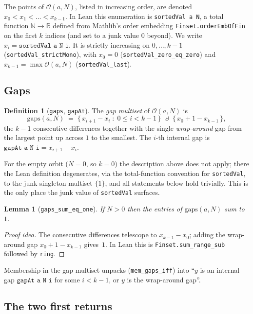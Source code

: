 \documentclass[11pt,reqno]{amsart}
\theoremstyle{plain}
\newtheorem{lemma}[theorem]{Lemma}
\theoremstyle{definition}
\newtheorem{definition}[theorem]{Definition}
\theoremstyle{remark}
\newcommand{\R}{\mathbb{R}}
\newcommand{\N}{\mathbb{N}}
\newcommand{\orb}{\mathcal{O}}
\newcommand{\code}[1]{\texttt{#1}}
\begin{document}
The points of $\orb(a,N)$, listed in increasing order, are denoted
$x_0 < x_1 < \dots < x_{k-1}$.  In Lean this enumeration is
\code{sortedVal a N}, a total function $\N\to\R$ defined from Mathlib's
order embedding \code{Finset.orderEmbOfFin} on the first $k$ indices (and set
to a junk value $0$ beyond).  We write
$x_i = \code{sortedVal a N i}$.  It is strictly increasing on $0,\dots,k-1$
(\code{sortedVal\_strictMono}), with $x_0 = 0$
(\code{sortedVal\_zero\_eq\_zero}) and $x_{k-1} = \max\orb(a,N)$
(\code{sortedVal\_last}).

\subsection{Gaps}

\begin{definition}[\code{gaps}, \code{gapAt}]
The \emph{gap multiset} of $\orb(a,N)$ is
\[
  \mathrm{gaps}(a,N) \;=\;
  \bigl\{\, x_{i+1}-x_i \;:\; 0 \le i < k-1 \,\bigr\}
  \;\uplus\;
  \bigl\{\, x_0 + 1 - x_{k-1} \,\bigr\},
\]
the $k-1$ consecutive differences together with the single \emph{wrap-around}
gap from the largest point up across $1$ to the smallest.  The $i$-th internal
gap is $\code{gapAt a N i} = x_{i+1}-x_i$.
\end{definition}

For the empty orbit ($N=0$, so $k=0$) the description above does not apply;
there the Lean definition degenerates, via the total-function convention for
\code{sortedVal}, to the junk singleton multiset $\{1\}$, and all statements
below hold trivially.  This is the only place the junk value of
\code{sortedVal} surfaces.

\begin{lemma}[\code{gaps\_sum\_eq\_one}]\label{lem:sum-one}
If $N>0$ then the entries of $\mathrm{gaps}(a,N)$ sum to~$1$.
\end{lemma}

\begin{proof}[Proof idea]
The consecutive differences telescope to $x_{k-1}-x_0$; adding the wrap-around
gap $x_0+1-x_{k-1}$ gives~$1$.  In Lean this is \code{Finset.sum\_range\_sub}
followed by \code{ring}.
\end{proof}

Membership in the gap multiset unpacks (\code{mem\_gaps\_iff}) into ``$y$ is an
internal gap $\code{gapAt a N i}$ for some $i<k-1$, or $y$ is the wrap-around
gap''.

\subsection{The two first returns}
\end{document}
